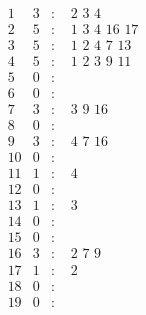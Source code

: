 \documentclass[12pt]{article}
\begin{document}
\begin{equation*}
\begin{array}{rrcl}
1&3&:&\,\,2\,\,3\,\,4\\
2&5&:&\,\,1\,\,3\,\,4\,\,16\,\,17\\
3&5&:&\,\,1\,\,2\,\,4\,\,7\,\,13\\
4&5&:&\,\,1\,\,2\,\,3\,\,9\,\,11\\
5&0&:&\\
6&0&:&\\
7&3&:&\,\,3\,\,9\,\,16\\
8&0&:&\\
9&3&:&\,\,4\,\,7\,\,16\\
10&0&:&\\
11&1&:&\,\,4\\
12&0&:&\\
13&1&:&\,\,3\\
14&0&:&\\
15&0&:&\\
16&3&:&\,\,2\,\,7\,\,9\\
17&1&:&\,\,2\\
18&0&:&\\
19&0&:&\\
\end{array}
\end{equation*}
\end{document}
